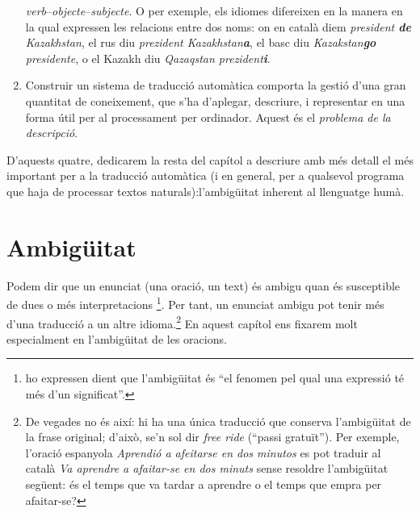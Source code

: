 \begin{enumerate}
  \emph{verb}--\emph{objecte}--\emph{subjecte}.  O per exemple, els
  idiomes difereixen en la manera en la qual expressen les relacions
  entre dos noms: on en català diem \emph{president \textbf{de}
    Kazakhstan}, el rus diu \emph{prezident Kazakhstan\textbf{a}}, el
  basc diu \emph{Kazakstan\textbf{go} presidente}, o el Kazakh diu
  \emph{Qazaqstan prezident\textbf{i}}.
  \item Construir un sistema de traducció automàtica comporta la
    gestió d'una gran quantitat de coneixement, que s'ha d'aplegar,
    descriure, i representar en una forma útil per al processament per
    ordinador. Aquest és el \emph{problema de la descripció}.
\end{enumerate}



D'aquests quatre, dedicarem la resta del capítol a descriure amb més
detall el més important per a la traducció automàtica (i en general,
per a qualsevol programa que haja de processar textos
naturals):l'am\-bi\-güi\-tat inherent al llenguatge humà.

\section{Ambigüitat}

Podem dir que un enunciat (una oració, un text) és ambigu quan és
susceptible de dues o més interpretacions
\citep{alcaraz97b}\footnote{\citet{don96u} ho expressen dient que
  l'ambigüitat és ``el fenomen pel qual una expressió té més d'un
  significat''.}. Per tant, un enunciat ambigu pot tenir més d'una
traducció a un altre idioma.\footnote{De vegades no és així: hi ha una
  única traducció que conserva l'ambigüitat de la frase original;
  d'això, se'n sol dir \emph{free ride} (``passi gratuït''). Per
  exemple, l'oració espanyola \emph{Aprendió a afeitarse en dos
    minutos} es pot traduir al català \emph{Va aprendre a afaitar-se
    en dos minuts} sense resoldre l'ambigüitat següent: és el temps
  que va tardar a aprendre o el temps que empra per afaitar-se?} En
aquest capítol ens fixarem molt especialment en l'ambigüitat de les
oracions.

